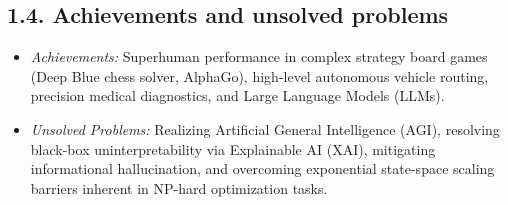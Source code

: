 \documentclass[../main.tex]{subfiles}
\begin{document}
\subsection{1.4. Achievements and unsolved problems}
\begin{itemize}
    \item \textit{Achievements:} Superhuman performance in complex strategy board games (Deep Blue chess solver, AlphaGo), high-level autonomous vehicle routing, precision medical diagnostics, and Large Language Models (LLMs).
    \item \textit{Unsolved Problems:} Realizing Artificial General Intelligence (AGI), resolving black-box uninterpretability via Explainable AI (XAI), mitigating informational hallucination, and overcoming exponential state-space scaling barriers inherent in NP-hard optimization tasks.
\end{itemize}
\end{document}
